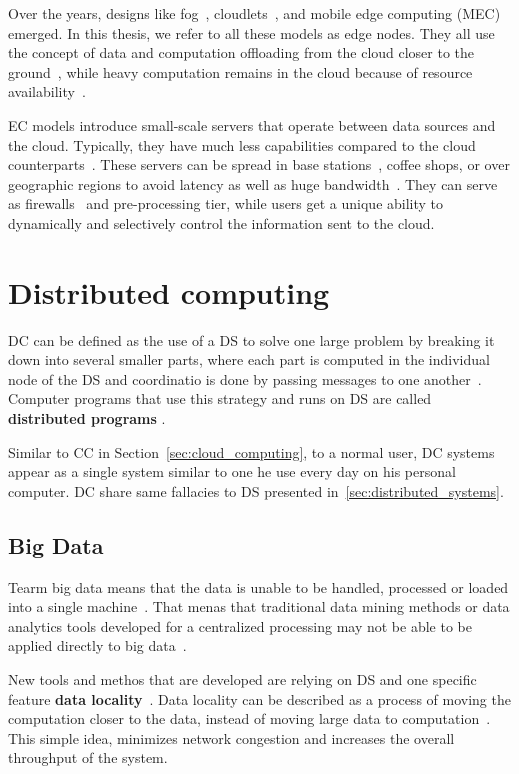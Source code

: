 Over the years, designs like fog~\cite{BonomiMNZ14}, cloudlets~\cite{MonsalveCC18}, and mobile edge computing (MEC)~\cite{WangZZWYW17} emerged. In this thesis, we refer to all these models as edge nodes. They all use the concept of data and computation offloading from the cloud closer to the ground~\cite{KhuneP19}, while heavy computation remains in the cloud because of resource availability~\cite{NingLSY20}. 

EC models introduce small-scale servers that operate between data sources and the cloud. Typically, they have much less capabilities compared to the cloud counterparts~\cite{ChenHLLW15}. These servers can be spread in base stations~\cite{WangZZWYW17}, coffee shops, or over geographic regions to avoid latency as well as huge bandwidth~\cite{MonsalveCC18}. They can serve as firewalls~\cite{SatyanarayananK19} and pre-processing tier, while users get a unique ability to dynamically and selectively control the information sent to the cloud.
%
%
\section{Distributed computing}\label{sec:distributed_computing}
%
DC can be defined as the use of a DS to solve one large problem by breaking it down into several smaller parts, where each part is computed in the individual node of the DS and coordinatio is done by passing messages to one another~\cite{0019513}. Computer programs that use this strategy and runs on DS are called \textbf{distributed programs} \cite{Vera16, andrews2000foundations}. 

Similar to CC in Section~\ref{sec:cloud_computing}, to a normal user, DC systems appear as a single system similar to one he use every day on his personal computer. DC share same fallacies to DS presented in~\ref{sec:distributed_systems}.
%
%
\subsection{Big Data}\label{sec:big_data}
%
Tearm big data means that the data is unable to be handled, processed or loaded into a single machine~\cite{FisherDCD12}. That menas that traditional data mining methods or data analytics tools developed for a centralized processing  may not be able to be applied directly to big data~\cite{Tsai2015}. 

New tools and methos that are developed are relying on DS and one specific feature \textbf{data locality}~\label{ds:data_locality}. Data locality can be described as a process of moving the computation closer to the data, instead of moving large data to computation~\cite{GuoFZ12}. This simple idea, minimizes network congestion and increases the overall throughput of the system.

